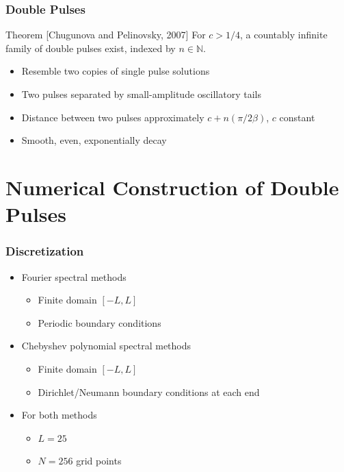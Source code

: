 \documentclass[16pt]{beamer}
\begin{document}
\begin{frame}
	\frametitle{Double Pulses}
	\fontsize{16}{7.2}\selectfont

	\begin{block}{Theorem \footnotesize [Chugunova and Pelinovsky, 2007]}
	For $c>1/4$, a countably infinite family of double pulses exist, indexed by $n \in \mathbb{N}$.
	\begin{itemize}
		\item Resemble two copies of single pulse solutions
		\item Two pulses separated by small-amplitude oscillatory tails
		\item Distance between two pulses approximately $c + n (\pi / 2 \beta)$, $c$ constant
		\item Smooth, even, exponentially decay
	\end{itemize}
	\end{block}

\end{frame}

\section{Numerical Construction of Double Pulses}

\begin{frame}
	\frametitle{Discretization}
	\fontsize{16}{7.2}\selectfont
	\begin{itemize} 
		\item Fourier spectral methods
		\begin{itemize} 
			\item Finite domain $[-L, L]$
			\item Periodic boundary conditions
		\end{itemize}
		\item Chebyshev polynomial spectral methods
		\begin{itemize} 
			\item Finite domain $[-L, L]$
			\item Dirichlet/Neumann boundary conditions at each end
		\end{itemize}
		\item For both methods
		\begin{itemize} 
			\item $L = 25$ 
			\item $N = 256$ grid points
		\end{itemize}
	\end{itemize}
\end{frame}
\end{document}
